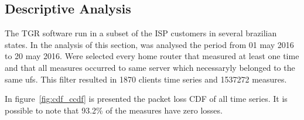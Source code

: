 \subsection{Descriptive Analysis}

The TGR software run in a subset of the ISP customers in several brazilian states. In the analysis of this section, was analysed the period from 01 may 2016 to 20 may 2016. Were selected every home router that measured at least one time and that all measures occurred to same server which necessaryly belonged to the same ufs. This filter resulted in 1870 clients time series and 1537272 measures.

In figure~\ref{fig:cdf_ccdf} is presented the packet loss CDF of all time series. It is possible to note that 93.2\% of the measures have zero losses.

